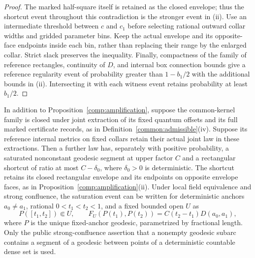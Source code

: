 \begin{proof}
The marked half-square itself is retained as the closed envelope;
thus the shortcut event throughout this contradiction is the stronger
event in (ii).  Use an intermediate threshold between $c$ and $c_1$
before selecting rational outward collar widths and gridded parameter
bins.  Keep the actual envelope and its opposite-face endpoints inside
each bin, rather than replacing their range by the enlarged collar.
Strict slack preserves the inequality.  Finally, compactness of the family of reference
rectangles, continuity of $D$, and internal box connection bounds give
a reference regularity event of probability greater than $1-b_1/2$
with the additional bounds in (ii).  Intersecting it with each witness
event retains probability at least $b_1/2$.
\end{proof}

\begin{proposition}
\label{comp:equality-tangent}
In addition to Proposition~\ref{comp:amplification}, suppose the
common-kernel family is closed under joint extraction of its fixed
quantum offsets and its full marked certificate records, as in
Definition~\ref{common:admissible}(iv).  Suppose its
reference internal metrics on fixed collars retain their actual joint
law in these extractions.  Then a further law has, separately with
positive probability, a saturated nonconstant geodesic segment at upper
factor $C$ and a rectangular shortcut of ratio at most $C-\delta_0$,
where $\delta_0>0$ is deterministic.  The shortcut retains its closed
rectangular envelope and its endpoints on opposite envelope faces,
as in Proposition~\ref{comp:amplification}(ii).
Under local field equivalence and
strong confluence, the saturation event can be written for deterministic
anchors $a_0\ne a_1$, rational $0<t_1<t_2<1$, and a fixed bounded open
$U$ as
\begin{equation}\label{comp:fixed-saturation}
 P([t_1,t_2])\Subset U,\qquad
 F_U(P(t_1),P(t_2))=C(t_2-t_1)D(a_0,a_1),
\end{equation}
where $P$ is the unique fixed-anchor geodesic, parametrized by fractional
length.  Only the public strong-confluence assertion that a nonempty
geodesic subarc contains a segment of a geodesic between points of a
deterministic countable dense set is used.
\end{proposition}


